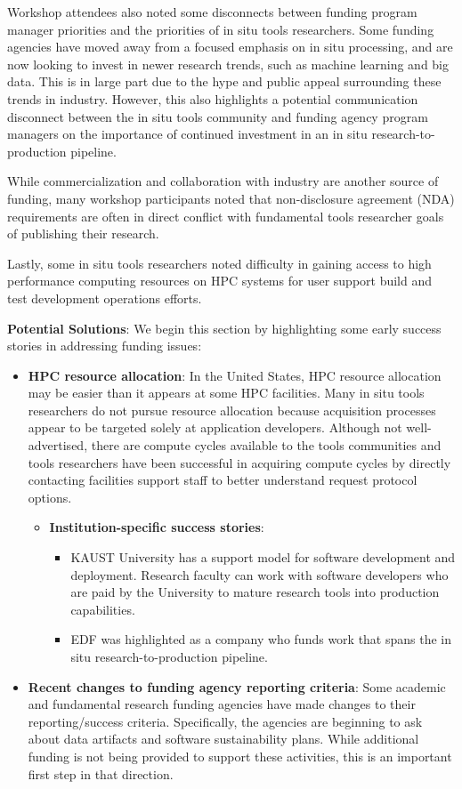 Workshop attendees also noted some disconnects between funding program manager priorities and  the priorities of in situ tools researchers.  Some funding agencies have moved away from a focused emphasis on in situ processing, and are now looking to invest in newer research trends, such as machine learning and big data.  This is in large part due to the hype and public appeal surrounding these trends in industry.  However, this also highlights a potential communication disconnect between the in situ tools community and funding agency program managers on the importance of continued investment in an in situ research-to-production pipeline.

While commercialization and collaboration with industry are another source of funding, many workshop participants noted that non-disclosure agreement (NDA) requirements are often in direct conflict with fundamental tools researcher goals of publishing their research. 

Lastly, some in situ tools researchers noted difficulty in gaining access to high performance computing resources on HPC systems for user support build and test development operations efforts.

\textbf{Potential Solutions}: We begin this section by highlighting some early success stories in addressing  funding issues:
 \begin{itemize}
\item \textbf{HPC resource allocation}:  In the United States,  HPC resource allocation may be easier than it appears at some HPC facilities. Many in situ tools researchers do not pursue resource allocation because acquisition processes appear to be targeted solely at application developers.  Although not well-advertised, there are compute cycles available to the tools communities and tools researchers have been successful in acquiring compute cycles by directly contacting facilities support staff to better understand request protocol options.
\begin{itemize}
\item  \textbf{Institution-specific success stories}:
\begin{itemize}
\item KAUST University has a support model for software development and deployment.   Research faculty can work with software developers who are paid by the University to mature research tools into production capabilities.  
\item EDF was highlighted as a company who funds work that spans the in situ research-to-production pipeline.  
\end{itemize}
\end{itemize}
\item \textbf{Recent changes to funding agency reporting criteria}: Some academic and fundamental research funding agencies have made changes to their reporting/success criteria. Specifically, the agencies are beginning to ask about data artifacts and software sustainability plans.  While additional funding is not being provided to support these activities, this is an important first step in that direction.
\end{itemize}


